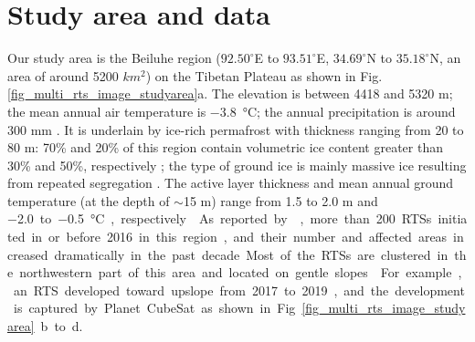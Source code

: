 \documentclass[authoryear,preprint,review,12pt]{elsarticle}
\begin{document}
\section{Study area and data}
\label{sec_studyarea_data}

Our study area is the Beiluhe region ($92.50^\circ$E to $93.51^\circ$E, $34.69^\circ$N to $35.18^\circ$N, an area of around 5200 $km^2$) on the Tibetan Plateau as shown in Fig. \ref{fig_multi_rts_image_studyarea}a.
The elevation is between 4418 and 5320 m; the mean annual air temperature is \SI{-3.8}{\celsius}; the annual precipitation is around 300 mm  \citep{luo_thermokarst_2015}.
It is underlain by ice-rich permafrost with thickness ranging from 20 to 80 m: 70\% and 20\% of this region contain volumetric ice content greater than 30\% and 50\%, respectively \citep{zhou_geocryology_2000, luo_thermokarst_2015}; 
the type of ground ice is mainly massive ice resulting from repeated segregation \citep{guodong1983mechanism}. 
The active layer thickness and mean annual ground temperature (at the depth of $\sim$15 m) range from 1.5 to 2.0 m and \SI{-2.0} to \SI{-0.5}{\celsius}, respectively \citep{zhou_geocryology_2000, wu2010changes, luo_thermokarst_2015,  wu2015changes}. 
As reported by \cite{luo2019recent}, more than 200 RTSs initiated in or before 2016 in this region,  and their number and affected areas increased dramatically in the past decade. 
Most of the RTSs are clustered in the northwestern part of this area and located on gentle slopes \citep{huang2020using}.
For example, an RTS developed toward upslope from 2017 to 2019, and the development is captured by Planet CubeSat as shown in Fig. \ref{fig_multi_rts_image_studyarea}b to d. 

\end{document}
